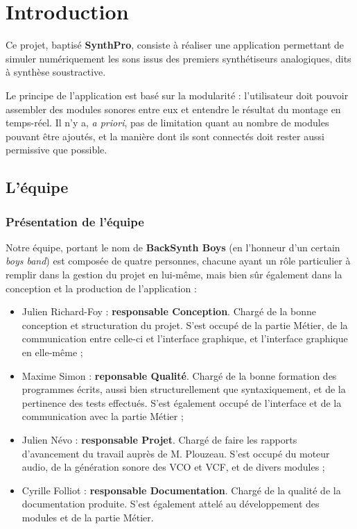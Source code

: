 \section{Introduction}

Ce projet, baptisé \textbf{SynthPro}, consiste à réaliser une
application permettant de simuler numériquement les sons issus des
premiers synthétiseurs analogiques, dits à synthèse soustractive.

Le principe de l'application est basé sur la modularité :
l'utilisateur doit pouvoir assembler des modules sonores entre eux
et entendre le résultat du montage en temps-réel. Il n'y a,
\emph{a priori}, pas de limitation quant au nombre de modules
pouvant être ajoutés, et la manière dont ils sont connectés doit
rester aussi permissive que possible.

\subsection{L'équipe}

\subsubsection{Présentation de l'équipe}

Notre équipe, portant le nom de \textbf{BackSynth Boys} (en
l'honneur d'un certain \emph{boys band}) est composée de quatre
personnes, chacune ayant un rôle particulier à remplir dans la
gestion du projet en lui-même, mais bien sûr également dans la
conception et la production de l'application :

\begin{itemize}
\item
  Julien Richard-Foy : \textbf{responsable Conception}. Chargé de la
  bonne conception et structuration du projet. S'est occupé de la
  partie Métier, de la communication entre celle-ci et l'interface
  graphique, et l'interface graphique en elle-même ;
\item
  Maxime Simon : \textbf{reponsable Qualité}. Chargé de la bonne
  formation des programmes écrits, aussi bien structurellement que
  syntaxiquement, et de la pertinence des tests effectués. S'est
  également occupé de l'interface et de la communication avec la
  partie Métier ;
\item
  Julien Névo : \textbf{responsable Projet}. Chargé de faire les
  rapports d'avancement du travail auprès de M. Plouzeau. S'est
  occupé du moteur audio, de la génération sonore des VCO et VCF, et
  de divers modules ;
\item
  Cyrille Folliot : \textbf{responsable Documentation}. Chargé de la
  qualité de la documentation produite. S'est également attelé au
  développement des modules et de la partie Métier.
\end{itemize}

